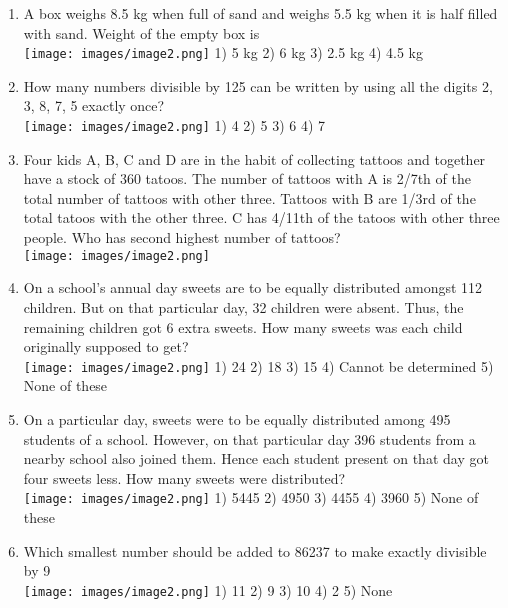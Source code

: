 \documentclass[
]{article}
\begin{document}
\begin{enumerate}
\item A box weighs 8.5 kg when full of sand and weighs 5.5 kg when it is half filled with sand. Weight of the empty box is  \\
\texttt{[image: images/image2.png]} 	1) 5 kg 	2) 6 kg 	3) 2.5 kg 	4) 4.5 kg
	\item How many numbers divisible by 125 can be written by using all the digits 2, 3, 8, 7, 5 exactly once? \\
\texttt{[image: images/image2.png]} 1) 4 	2) 5 	3) 6 	4) 7
\item Four kids A, B, C and D are in the habit of collecting tattoos and together have a stock of 360 tatoos. The number of tattoos with A is 2/7th of the total number of tattoos with other three. Tattoos with B are 1/3rd of the total tatoos with the other three. C has 4/11th of the tatoos with other three people. Who has second highest number of tattoos?  \\
\texttt{[image: images/image2.png]} 
	\item On a school’s annual day sweets are to be equally distributed amongst 112 children. But on that particular day, 32 children were absent. Thus, the remaining children got 6 extra 	sweets. How many sweets was each child originally supposed to get? \\
\texttt{[image: images/image2.png]} 1) 24 	2) 18 	3) 15 4) Cannot be determined 	5) None of these
\item On a particular day, sweets were to be equally distributed among 495 students of a school. However, on that particular day 396 students from a nearby school also joined them. Hence each student present on that day got four sweets less. How many sweets were distributed? \\
\texttt{[image: images/image2.png]} 1) 5445 	2) 4950 	3) 4455 	4) 3960 	5) None of these
	\item Which smallest number should be added to 86237 to make exactly divisible by 9  \\
	\texttt{[image: images/image2.png]} 1) 11 	2) 9 	3) 10 	4) 2 	5) None



\end{enumerate}
\end{document}
